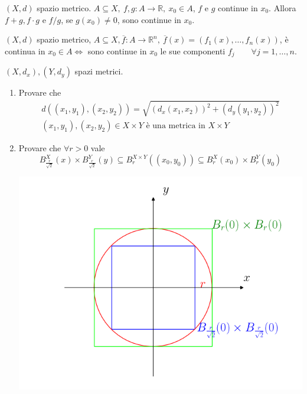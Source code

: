 \begin{theorem}
	$(X,d)$ spazio metrico. $A \subseteq X, \ f,g: A \rightarrow \mathbb{R}, \ x_0 \in A$, $f$ e $g$ continue in $x_0$. Allora $f + g, f \cdot g$ e $f / g$, se $g(x_0) \neq 0$, sono continue in $x_0$.
\end{theorem}


\begin{proposition}
	$(X,d)$ spazio metrico, $A \subseteq X, \overline{f}: A \rightarrow \mathbb{R}^n, \ \overline{f}(x) = (f_1(x), \ldots, f_n(x))$, è continua in $x_0 \in A \iff$ sono continue in $x_0$ le sue componenti $f_j \qquad \forall j = 1, \ldots, n$.
\end{proposition}


\begin{exbar}
\begin{example}
	$(X,d_x),(Y,d_y)$ spazi metrici.
	\begin{enumerate}
		\item Provare che \begin{gather*}
			d((x_1,y_1), (x_2,y_2)) = \sqrt{(d_x(x_1,x_2))^2 + (d_y(y_1,y_2))^2}
			\\
			(x_1, y_1), (x_2,y_2) \in X \times Y \text{ è una metrica in } X \times Y
		\end{gather*}
		
		\item Provare che $\forall r > 0$ vale
		\begin{equation*}
			B_{\frac{r}{\sqrt{2}}}^{X}(x) \times B_{\frac{r}{\sqrt{2}}}^{Y}(y) \subseteq B_{r}^{X \times Y} ((x_0,y_0)) \subseteq B_{r}^{X} (x_0) \times B_{r}^{Y} (y_0)
		\end{equation*}
		
		\begin{center}
			\includegraphics[width=0.7\linewidth]{spazi_metrici_e_normati/pag175}
			\label{fig:pag175}
		\end{center}
			

\end{enumerate}
\end{example}
\end{exbar}
